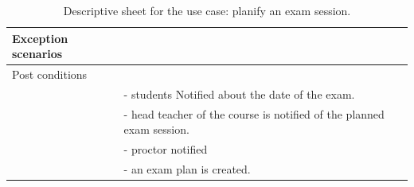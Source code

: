 \documentclass[]{uc2pfecaneva}
\begin{document}
\begin{table}[t]
\begin{tabularx}{\textwidth}{|l|X|}
            Exception scenarios   &                                                                                                                                                                   \\ \hline
            Post conditions       &                                                                                                                                                                   \\
            & - students Notified about the date of the exam.                                                                                                                   \\
            & - head teacher of the course is notified of the planned exam session.                                                                                             \\
            & - proctor notified                                                                                           \\
            & - an exam plan is created.                                                                                                                               \\ \hline
        \end{tabularx}
        \caption{Descriptive sheet for the use case: planify an exam session.}
        \label{table:2}
    \end{table}
    \clearpage
\end{document}
